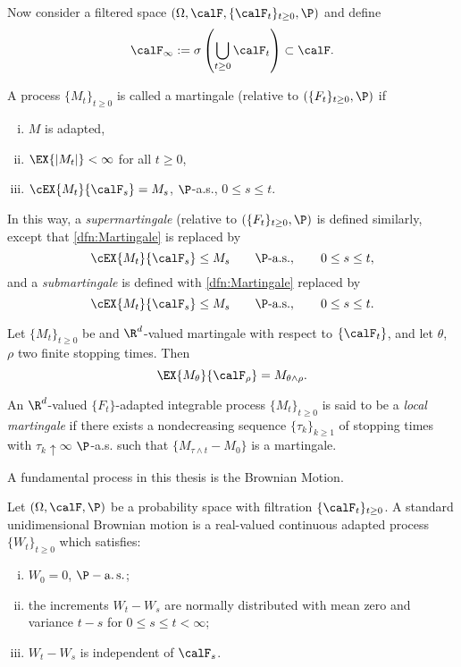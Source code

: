 	Now consider a filtered space $\left(\Omega, \calF, \{\calF_t\}_{t\geq 0}, \P \right)$ and define
$$
	\calF_{\infty}:= \sigma
		\left(
			\bigcup_{t\geq 0}
			\calF_t
		\right) \subset \calF.
$$

\begin{definition}[Martingale]
	A process $\{M_t\}_{t\geq 0}$ is called a martingale (relative to $\left(\{F_t \}_{t\geq 0}, \P \right)$ if
	\begin{enumerate}[(i)]
		\item
			$M$ is adapted,
		\item
			$\EX{|M_t|}<\infty$ \qquad for all $t\geq 0$,
		\item\label{dfn:Martingale}
			$
				\cEX{M_t}{\calF_s} = M_s
			$, \qquad $\P$-a.s., \qquad $0\leq s \leq t$.
	\end{enumerate}
\end{definition}

	In this way, a \emph{supermartingale} (relative to $\left(\{F_t \}_{t\geq 0}, \P \right)$ is defined similarly, 
except that \eqref{dfn:Martingale} is replaced by
$$
	\cEX{M_t}{\calF_s}\leq M_s
	\qquad \P\text{-a.s.},
	\qquad 0\leq s \leq t, 
$$ and a \emph{submartingale} is defined with \eqref{dfn:Martingale} 
replaced by
$$
	\cEX{M_t}{\calF_s} \leq M_s
	\qquad \P\text{-a.s.},
	\qquad 0\leq s \leq t.
$$ 
\begin{thm}
	Let $\{M_t\}_{t\geq 0}$ be and $\R^d$-valued martingale with respect to $\{\calF_t\}$, and let $\theta$, $\rho$ two 
	finite stopping times. Then 
	$$
		\EX{M_{\theta}}{\calF_{\rho}}= M_{\theta \wedge\rho}.
	$$
\end{thm}
\begin{definition}
	An $\R^d$-valued $\{F_t\}$-adapted integrable process $\{M_t\}_{t\geq 0}$ is said to be a \emph{local martingale}
	if there exists a nondecreasing sequence $\{\tau_k\}_{k\geq 1}$ of stopping times with $\tau_k \uparrow \infty$
	$\P$-a.s. such that $\{M_{\tau\wedge t} - M_0 \}$ is a martingale.
\end{definition}
A fundamental process in this thesis is the Brownian Motion.
\begin{definition}
	Let $(\Omega, \calF, \P)$ be a probability space with filtration $\{\calF_t\}_{t\geq 0}$. A standard unidimensional
	Brownian motion is a real-valued continuous adapted process $\{W_t\}_{t\geq 0}$ which satisfies:
	\begin{enumerate}[(i)]
		\item 
			$W_0=0$, \qquad $\P-\as$;
		\item 
			the increments $W_t-W_s$ are normally distributed with mean zero and variance $t-s$ for 
			$0\leq s\leq t<\infty$;
		\item
			$W_t-W_s$ is independent of $\calF_s$.
	\end{enumerate}
\end{definition}

